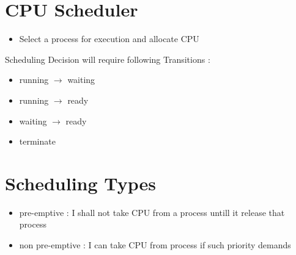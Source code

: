 \documentclass[12pt]{article}
\newcommand*{\threadsmall}{
\begin{circuitikz}[
 longpot/.style = {R, resistors/scale=0.5,
 resistors/width=1, resistors/zigs=6}]
 \draw (0,0) to[longpot] ++(0,-1);
\end{circuitikz}
}
\begin{document}
\begin{center}
\end{center}








\section{CPU Scheduler}


\begin{itemize}
	\item Select a process for execution and allocate CPU
\end{itemize}


Scheduling Decision will require following Transitions :

\begin{itemize}
	\item running $\to$ waiting
	\item running $\to$ ready
	\item waiting $\to$ ready
	\item terminate
\end{itemize}





\section{Scheduling Types}

\begin{itemize}
	\item pre-emptive : 
	I shall not take CPU from a process untill it release that process
	\item non pre-emptive :
	I can take CPU from process if such priority demands
\end{itemize}
\end{document}
